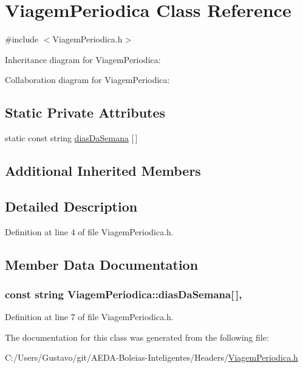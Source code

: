\hypertarget{class_viagem_periodica}{\section{Viagem\+Periodica Class Reference}
\label{class_viagem_periodica}
}


{\ttfamily \#include $<$Viagem\+Periodica.\+h$>$}



Inheritance diagram for Viagem\+Periodica\+:


Collaboration diagram for Viagem\+Periodica\+:
\subsection*{Static Private Attributes}
\begin{DoxyCompactItemize}
\item 
static const string \hyperlink{class_viagem_periodica_aec0deb1571c96da485be2d49e85d48a6}{dias\+Da\+Semana} \mbox{[}$\,$\mbox{]}
\end{DoxyCompactItemize}
\subsection*{Additional Inherited Members}


\subsection{Detailed Description}


Definition at line 4 of file Viagem\+Periodica.\+h.



\subsection{Member Data Documentation}
\hypertarget{class_viagem_periodica_aec0deb1571c96da485be2d49e85d48a6}{
\subsubsection[{dias\+Da\+Semana}]{\setlength{\rightskip}{0pt plus 5cm}const string Viagem\+Periodica\+::dias\+Da\+Semana\mbox{[}$\,$\mbox{]}\hspace{0.3cm}{\ttfamily [static]}, {\ttfamily [private]}}}\label{class_viagem_periodica_aec0deb1571c96da485be2d49e85d48a6}


Definition at line 7 of file Viagem\+Periodica.\+h.



The documentation for this class was generated from the following file\+:\begin{DoxyCompactItemize}
\item 
C\+:/\+Users/\+Gustavo/git/\+A\+E\+D\+A-\/\+Boleias-\/\+Inteligentes/\+Headers/\hyperlink{_viagem_periodica_8h}{Viagem\+Periodica.\+h}\end{DoxyCompactItemize}
